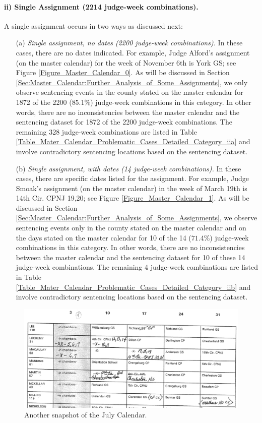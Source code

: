 \documentclass[11pt, oneside]{article}   	%
\theoremstyle{ModifiedStyle}
\begin{document}
		\paragraph{ii) Single Assignment (2214 judge-week combinations).}
		\label{Category_ii}
		A single assignment occurs in two ways as discussed next:
			\begin{itemize}
				\vspace{-2mm}
				\item[(a)] \emph{Single assignment, no dates (2200 judge-week combinations).} In these cases, there are no dates indicated. For example, Judge Alford's assignment (on the master calendar) for the week of November 6th is York GS; see Figure \ref{Figure_Master_Calendar_0}. As will be discussed in Section \ref{Sec:Master_Calendar:Further_Analysis_of_Some_Assignments}, we only observe sentencing events in the county stated on the master calendar for 1872 of the 2200 ($85.1\%$) judge-week combinations in this category. In other words, there are no inconsistencies between the master calendar and the sentencing dataset for 1872 of the 2200 judge-week combinations. The remaining 328 judge-week combinations are listed in Table \ref{Table_Mater_Calendar_Problematic_Cases_Detailed_Category_iia} and involve contradictory sentencing locations based on the sentencing dataset.
				\vspace{-2mm}
				\item[(b)] \emph{Single assignment, with dates (14 judge-week combinations).} In these cases, there are specific dates listed for the assignment. For example, Judge Smoak's assignment (on the master calendar) in the week of March 19th is 14th Cir. CPNJ 19,20; see Figure \ref{Figure_Master_Calendar_1}. As will be discussed in Section \ref{Sec:Master_Calendar:Further_Analysis_of_Some_Assignments}, we observe sentencing events only in the county stated on the master calendar and on the days stated on the master calendar for 10 of the 14 ($71.4\%$) judge-week combinations in this category. In other words, there are no inconsistencies between the master calendar and the sentencing dataset for 10 of these 14 judge-week combinations. The remaining 4 judge-week combinations are listed in Table \ref{Table_Mater_Calendar_Problematic_Cases_Detailed_Category_iib} and involve contradictory sentencing locations based on the sentencing dataset.
			\end{itemize}

		\begin{figure}[ht]
			\centering
			\includegraphics[scale=0.6]{Figures/Fig4}
			\caption{Another snapshot of the July Calendar.}
			\label{Figure_Master_Calendar_4}
		\end{figure}
\end{document}
